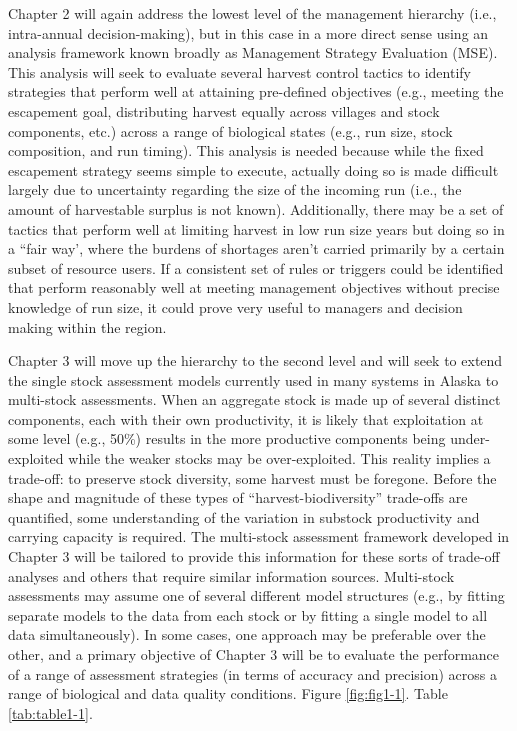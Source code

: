 \documentclass[12pt,]{book}
\theoremstyle{definition}
\theoremstyle{definition}
\theoremstyle{definition}
\theoremstyle{remark}
\begin{document}
Chapter 2 will again address the lowest level of the management
hierarchy (i.e., intra-annual decision-making), but in this case in a
more direct sense using an analysis framework known broadly as
Management Strategy Evaluation (MSE). This analysis will seek to
evaluate several harvest control tactics to identify strategies that
perform well at attaining pre-defined objectives (e.g., meeting the
escapement goal, distributing harvest equally across villages and stock
components, etc.) across a range of biological states (e.g., run size,
stock composition, and run timing). This analysis is needed because
while the fixed escapement strategy seems simple to execute, actually
doing so is made difficult largely due to uncertainty regarding the size
of the incoming run (i.e., the amount of harvestable surplus is not
known). Additionally, there may be a set of tactics that perform well at
limiting harvest in low run size years but doing so in a ``fair way',
where the burdens of shortages aren't carried primarily by a certain
subset of resource users. If a consistent set of rules or triggers could
be identified that perform reasonably well at meeting management
objectives without precise knowledge of run size, it could prove very
useful to managers and decision making within the region.

Chapter 3 will move up the hierarchy to the second level and will seek
to extend the single stock assessment models currently used in many
systems in Alaska to multi-stock assessments. When an aggregate stock is
made up of several distinct components, each with their own
productivity, it is likely that exploitation at some level (e.g., 50\%)
results in the more productive components being under-exploited while
the weaker stocks may be over-exploited. This reality implies a
trade-off: to preserve stock diversity, some harvest must be foregone.
Before the shape and magnitude of these types of
``harvest-biodiversity'' trade-offs are quantified, some understanding
of the variation in substock productivity and carrying capacity is
required. The multi-stock assessment framework developed in Chapter 3
will be tailored to provide this information for these sorts of
trade-off analyses and others that require similar information sources.
Multi-stock assessments may assume one of several different model
structures (e.g., by fitting separate models to the data from each stock
or by fitting a single model to all data simultaneously). In some cases,
one approach may be preferable over the other, and a primary objective
of Chapter 3 will be to evaluate the performance of a range of
assessment strategies (in terms of accuracy and precision) across a
range of biological and data quality conditions. Figure
\ref{fig:fig1-1}. Table \ref{tab:table1-1}.
\end{document}
